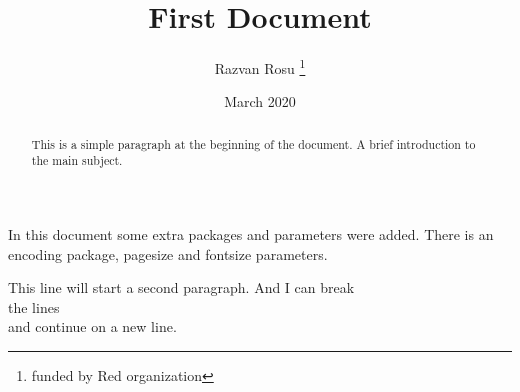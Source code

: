 \documentclass[12pt, letterpaper, twoside]{article}
\title{First Document}
\author{Razvan Rosu \thanks{funded by Red organization}}
\date{March 2020}
\begin{document}
	\begin{titlepage}
		\maketitle
	\end{titlepage}

	\begin{abstract}
		This is a simple paragraph at the beginning of the document. A brief introduction to the main subject.
	\end{abstract}

	In this document some extra packages and parameters were added. There is an encoding package, pagesize and fontsize parameters.
	
	This line will start a second paragraph. And I can break\\ the lines\\ and continue on a new line.
\end{document}
